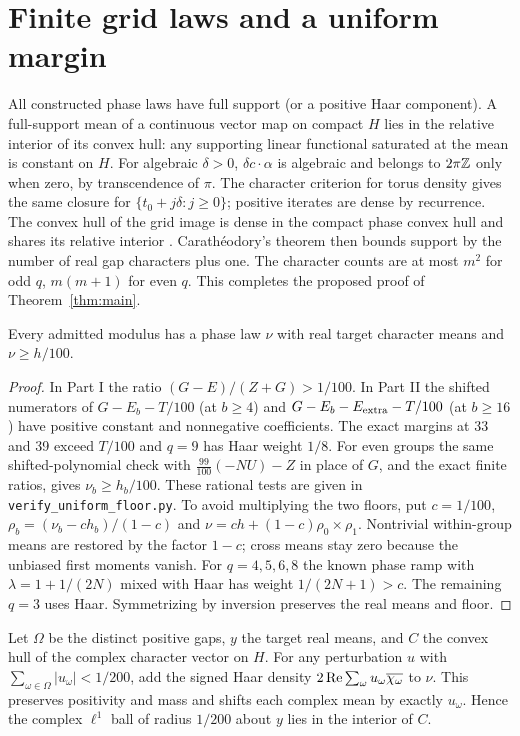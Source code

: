\documentclass[11pt]{article}
\begin{document}
\section{Finite grid laws and a uniform margin}
All constructed phase laws have full support (or a positive Haar component). A full-support mean of a continuous vector map on compact $H$ lies in the relative interior of its convex hull: any supporting linear functional saturated at the mean is constant on $H$. For algebraic $\delta>0$, $\delta c\cdot\alpha$ is algebraic and belongs to $2\pi\mathbb Z$ only when zero, by transcendence of $\pi$. The character criterion for torus density gives the same closure for $\{t_0+j\delta:j\ge0\}$; positive iterates are dense by recurrence. The convex hull of the grid image is dense in the compact phase convex hull and shares its relative interior \cite[Theorem 6.3]{rockafellar}. Carath\'eodory's theorem then bounds support by the number of real gap characters plus one. The character counts are at most $m^2$ for odd $q$, $m(m+1)$ for even $q$. This completes the proposed proof of Theorem~\ref{thm:main}.
\begin{theorem}\label{thm:floor}
Every admitted modulus has a phase law $\nu$ with real target character means and $\nu\ge h/100$.
\end{theorem}
\begin{proof}
In Part I the ratio $(G-E)/(Z+G)>1/100$. In Part II the shifted numerators of $G-E_b-T/100$ (at $b\ge4$) and $G-E_b-E_{\rm extra}-T/100$ (at $b\ge16$) have positive constant and nonnegative coefficients. The exact margins at 33 and 39 exceed $T/100$ and $q=9$ has Haar weight $1/8$. For even groups the same shifted-polynomial check with $\tfrac{99}{100}(-NU)-Z$ in place of $G$, and the exact finite ratios, gives $\nu_b\ge h_b/100$. These rational tests are given in \texttt{verify\_uniform\_floor.py}. To avoid multiplying the two floors, put $c=1/100$, $\rho_b=(\nu_b-ch_b)/(1-c)$ and $\nu=ch+(1-c)\rho_0\times\rho_1$. Nontrivial within-group means are restored by the factor $1-c$; cross means stay zero because the unbiased first moments vanish. For $q=4,5,6,8$ the known phase ramp \cite[Proposition S22]{kang} with $\lambda=1+1/(2N)$ mixed with Haar has weight $1/(2N+1)>c$. The remaining $q=3$ uses Haar. Symmetrizing by inversion preserves the real means and floor.
\end{proof}
Let $\Omega$ be the distinct positive gaps, $y$ the target real means, and $C$ the convex hull of the complex character vector on $H$. For any perturbation $u$ with $\sum_{\omega\in\Omega}|u_\omega|<1/200$, add the signed Haar density $2\operatorname{Re}\sum_\omega u_\omega\overline{\chi_\omega}$ to $\nu$. This preserves positivity and mass and shifts each complex mean by exactly $u_\omega$. Hence the complex $\ell^1$ ball of radius $1/200$ about $y$ lies in the interior of $C$.
\end{document}
